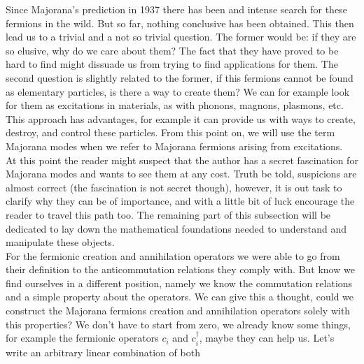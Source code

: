 Since Majorana's prediction in 1937 there has been and intense search for these fermions in the wild. But so far, nothing conclusive has been obtained. This then lead us to a trivial and a not so trivial question. The former would be: if they are so elusive, why do we care about them? The fact that they have proved to be hard to find might dissuade us from trying to find applications for them. The second question is slightly related to the former, if this fermions cannot be found as elementary particles, is there a way to create them? We can for example look for them as excitations in materials, as with phonons, magnons, plasmons, etc. This approach has advantages, for example it can provide us with ways to create, destroy, and control these particles. From this point on, we will use the term Majorana modes when we refer to Majorana fermions arising from excitations.\\

At this point the reader might suspect that the author has a secret fascination for Majorana modes and wants to see them at any cost. Truth be told, suspicions are almost correct (the fascination is not secret though), however, it is out task to clarify why they can be of importance, and with a little bit of luck encourage the reader to travel this path too. The remaining part of this subsection will be dedicated to lay down the mathematical foundations needed to understand and manipulate these objects.\\

For the fermionic creation and annihilation operators we were able to go from their definition to the anticommutation relations they comply with. But know we find ourselves in a different position, namely we know the commutation relations and a simple property about the operators. We can give this a thought, could we construct the Majorana fermions creation and annihilation operators solely with this properties? We don't have to start from zero, we already know some things, for example the fermionic operators $c_i$ and $c_i^\dagger$, maybe they can help us. Let's write an arbitrary linear combination of both

